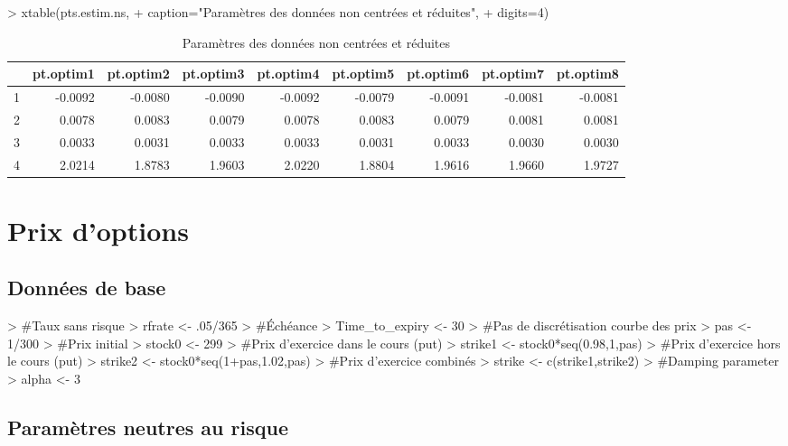 \documentclass[letter]{report}
\begin{document}
\begin{Schunk}
\begin{Sinput}
> 	xtable(pts.estim.ns, 
+ 			caption="Paramètres des données non centrées et réduites",
+ 			digits=4)
\end{Sinput}
% latex table generated in R 3.0.2 by xtable 1.7-4 package
% Mon Oct 13 12:28:07 2014
\begin{table}[ht]
\centering
\begin{tabular}{rrrrrrrrr}
  \hline
 & pt.optim1 & pt.optim2 & pt.optim3 & pt.optim4 & pt.optim5 & pt.optim6 & pt.optim7 & pt.optim8 \\ 
  \hline
1 & -0.0092 & -0.0080 & -0.0090 & -0.0092 & -0.0079 & -0.0091 & -0.0081 & -0.0081 \\ 
  2 & 0.0078 & 0.0083 & 0.0079 & 0.0078 & 0.0083 & 0.0079 & 0.0081 & 0.0081 \\ 
  3 & 0.0033 & 0.0031 & 0.0033 & 0.0033 & 0.0031 & 0.0033 & 0.0030 & 0.0030 \\ 
  4 & 2.0214 & 1.8783 & 1.9603 & 2.0220 & 1.8804 & 1.9616 & 1.9660 & 1.9727 \\ 
   \hline
\end{tabular}
\caption{Paramètres des données non centrées et réduites} 
\end{table}\end{Schunk}

\section{Prix d'options}

\subsection{Données de base}

\begin{Schunk}
\begin{Sinput}
> #Taux sans risque
> rfrate <- .05/365
> #Échéance
> Time_to_expiry <- 30
> #Pas de discrétisation courbe des prix
> pas <- 1/300 
> #Prix initial
> stock0 <- 299
> #Prix d'exercice dans le cours (put)
> strike1 <- stock0*seq(0.98,1,pas)  
> #Prix d'exercice hors le cours (put)
> strike2 <- stock0*seq(1+pas,1.02,pas) 
> #Prix d'exercice combinés
> strike <- c(strike1,strike2)
> #Damping parameter
> alpha <- 3
\end{Sinput}
\end{Schunk}

\subsection{Paramètres neutres au risque}
\end{document}
